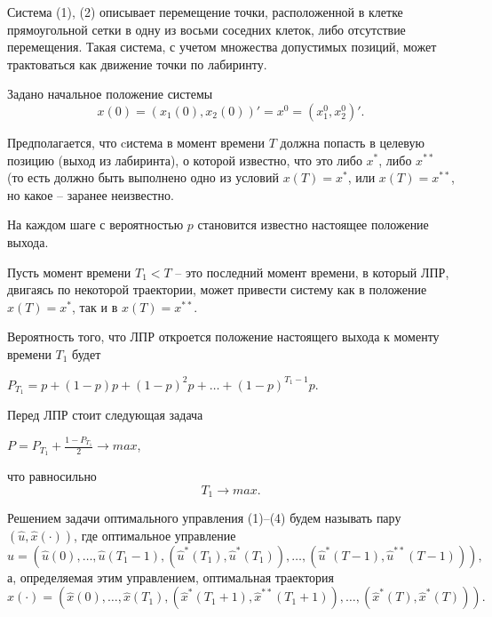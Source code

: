 Система (1), (2) описывает перемещение точки, расположенной в клетке прямоугольной сетки в одну из восьми соседних клеток, либо отсутствие перемещения. %
Такая система, с учетом множества допустимых позиций, может трактоваться как движение точки по лабиринту.

Задано начальное положение системы
\begin{equation} \label{eq3}
 x(0)=(x_1(0),x_2(0))'=x^0=(x_1^0,x_2^0)'.
\end{equation}

Предполагается, что cистема в момент времени $T$ должна попасть в целевую позицию (выход из лабиринта), о которой известно, что это либо $x^*$, либо $x^{**}$ (то есть должно быть выполнено одно из условий $x(T)=x^*$, или $x(T)=x^{**}$, но какое -- заранее неизвестно.

На каждом шаге с вероятностью $p$ становится известно настоящее положение выхода.

Пусть момент времени $T_1<T$ -- это последний момент времени, в который ЛПР, двигаясь по некоторой траектории, может привести систему как в положение $x(T)=x^*$, так и в $x(T)=x^{**}$.

Вероятность того, что ЛПР откроется положение настоящего выхода к моменту времени $T_1$ будет
\begin{center}
$P_{T_1}=p+(1-p)p+{(1-p)^2}p+\ldots+{(1-p)^{{T_1}-1}p}$.
\end{center}
Перед ЛПР стоит следующая задача
\begin{center}
$P=P_{T_1}+\frac{1-P_{T_1}}{2}\rightarrow max$,
\end{center}
что равносильно
\begin{equation} \label{eq4}
T_1 \rightarrow max .
\end{equation}


Решением задачи оптимального управления (1)--(4) будем называть пару $(\hat{u}, \hat{x}(\cdot))$, где
оптимальное управление
$$
\hat{u}=(\hat{u}(0),\ldots ,\hat{u}({{T}_{1}}-1),({{{\hat{u}}}^{*}}({{T}_{1}}),{{{\hat{u}}}^{*}}({{T}_{1}})),\ldots ,({{{\hat{u}}}^{*}}(T-1),{{{\hat{u}}}^{**}}(T-1))),
$$
а, определяемая этим управлением, оптимальная траектория
$$
\hat{x}(\cdot)=(\hat{x}(0),\ldots ,\hat{x}({{T}_{1}}),({{{\hat{x}}}^{*}}({{T}_{1}}+1),{{{\hat{x}}}^{**}}({{T}_{1}}+1)),\ldots ,({{{\hat{x}}}^{*}}(T),{{{\hat{x}}}^{*}}(T))).
$$

